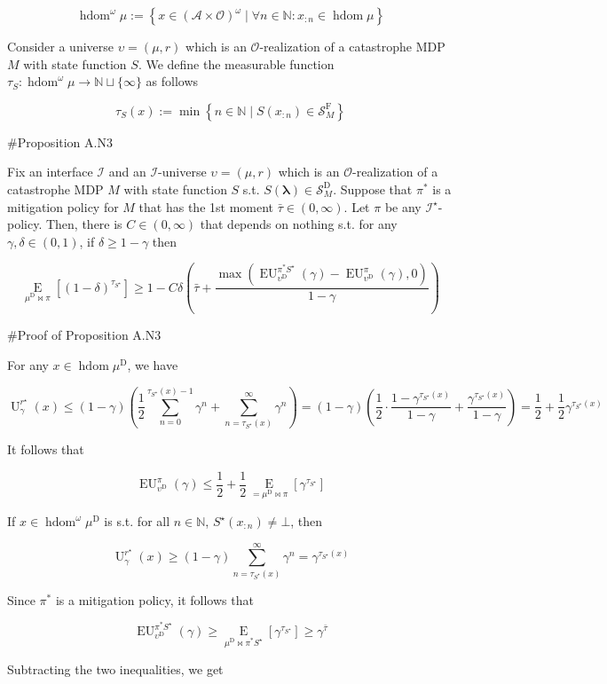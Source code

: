 \documentclass[a4paper]{article}
\newcommand{\AP}[1]{\left(#1\right)}
\newcommand{\AB}[1]{\left[#1\right]}
\newcommand{\AC}[1]{\left\{#1\right\}}
\newcommand{\Ea}[2]{\underset{#1}{\operatorname{E}}\AB{#2}}
\newcommand{\Nats}{\mathbb{N}}
\newcommand{\Estr}{\boldsymbol{\lambda}}
\newcommand{\Ob}{\mathcal{O}}
\newcommand{\A}{\mathcal{A}}
\newcommand{\St}{\mathcal{S}}
\newcommand{\In}{\mathcal{I}}
\DeclareMathOperator{\HD}{hdom}
\newcommand{\RMD}{\mathrm{D}}
\newcommand{\RMF}{\mathrm{F}}
\newcommand{\SF}{\St^{\RMF}}
\newcommand{\SD}{\St^{\RMD}}
\newcommand{\UD}{\upsilon^{\RMD}}
\newcommand{\Ut}{\operatorname{U}}
\newcommand{\EU}{\operatorname{EU}}
\begin{document}
$$\HD^\omega\mu := \AC{x \in (\A \times \Ob)^\omega \mid \forall n \in \Nats: x_{:n} \in \HD{\mu}}$$

Consider a universe $\upsilon=(\mu,r)$ which is an $\Ob$-realization of a catastrophe MDP $M$ with state function $S$. We define the measurable function $\tau_S: \HD^\omega{\mu} \rightarrow \Nats \sqcup \{\infty\}$ as follows

$$\tau_S(x) := \min\AC{n \in \Nats \mid S\AP{x_{:n}} \in \SF_M}$$

\#Proposition A.N3

Fix an interface $\In$ and an $\In$-universe $\upsilon=(\mu,r)$ which is an $\Ob$-realization of a catastrophe MDP $M$ with state function $S$ s.t. $S(\Estr)\in\SD_M$. Suppose that $\pi^*$ is a mitigation policy for $M$ that has the 1st moment $\bar{\tau}\in(0,\infty)$. Let $\pi$ be any $\In^\star$-policy. Then, there is $C\in(0,\infty)$ that depends on nothing s.t. for any $\gamma,\delta\in(0,1)$, if $\delta \geq 1-\gamma$ then

$$\Ea{\mu^\RMD\bowtie\pi}{(1-\delta)^{\tau_{S^\star}}} \geq 1 - C\delta\AP{\bar{\tau}+\frac{\max\AP{\EU_{\upsilon^{\RMD}}^{\pi^* S^\star}(\gamma)-\EU_{\upsilon^{\RMD}}^{\pi}(\gamma),0}}{1-\gamma}}$$

\#Proof of Proposition A.N3

For any $x \in \HD{\mu^\RMD}$, we have

$$\Ut^{r^\star}_\gamma(x) \leq (1-\gamma)\AP{\frac{1}{2}\sum_{n=0}^{\tau_{S^\star}(x)-1}{\gamma^n} + \sum_{n=\tau_{S^\star}(x)}^\infty \gamma^n} = (1-\gamma)\AP{\frac{1}{2} \cdot \frac{1 - \gamma^{\tau_{S^\star}(x)}}{1-\gamma}+\frac{\gamma^{\tau_{S^\star}(x)}}{1-\gamma}}=\frac{1}{2}+\frac{1}{2}\gamma^{\tau_{S^\star}(x)}$$

It follows that

$$\EU_{\UD}^\pi(\gamma) \leq \frac{1}{2}+\frac{1}{2}\Ea{=\mu^\RMD\bowtie\pi}{\gamma^{\tau_{S^\star}}}$$

If $x \in \HD^\omega{\mu^\RMD}$ is s.t. for all $n\in\Nats$, $S^\star\AP{x_{:n}}\ne\bot$, then

$$\Ut^{r^\star}_\gamma(x) \geq (1-\gamma)\sum_{n=\tau_{S^\star}(x)}^\infty \gamma^n = \gamma^{\tau_{S^\star}(x)}$$

Since $\pi^*$ is a mitigation policy, it follows that

$$\EU_{\UD}^{\pi^*S^\star}(\gamma) \geq \Ea{\mu^\RMD\bowtie\pi^*S^\star}{\gamma^{\tau_{S^\star}}} \geq \gamma^{\bar{\tau}}$$

Subtracting the two inequalities, we get
\end{document}
